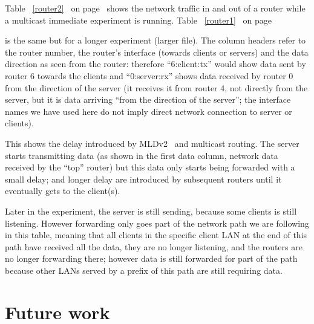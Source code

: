 \documentclass[a4paper,11pt,twocolumn]{article}
\newcommand{\TODO}[1]{\par\noindent%
\hspace*{\fill}%
\framebox{\parbox{0.9\linewidth}{{\bf TODO: }#1}}%
\hspace*{\fill}%
}
\newcommand{\pref}[1]{%
\ref{#1}%
\ifnum\thepage=0\pageref{#1}\else\ on page~\pageref{#1}\fi%
}
\begin{document}
Table~\pref{router2} shows the network traffic in and out of a router
while a multicast immediate experiment is running. Table~\pref{router1}
is the same but for a longer experiment (larger file). The column
headers refer to the router number, the router's interface (towards
clients or servers) and the data direction as seen from the router:
therefore ``6:client:tx'' would show data sent by router 6 towards
the clients and ``0:server:rx'' shows data received by router 0 from
the direction of the server (it receives it from router 4, not directly
from the server, but it is data arriving ``from the direction of the
server''; the interface names we have used here do not imply direct
network connection to server or clients).

\TODO{Show graphs}

This shows the delay introduced by MLDv2~\cite{rfc:3810} and multicast
routing.  The server starts transmitting data (as shown in the first
data column, network data received by the ``top'' router) but this
data only starts being forwarded with a small delay; and longer delay
are introduced by subsequent routers until it eventually gets to the
client(s).

Later in the experiment, the server is still sending, because some
clients is still listening. However forwarding only goes part of
the network path we are following in this table, meaning that all
clients in the specific client LAN at the end of this path have
received all the data, they are no longer listening, and the routers
are no longer forwarding there; however data is still forwarded
for part of the path because other LANs served by a prefix of this
path are still requiring data.

\section{Future work}
\label{future}
\end{document}
